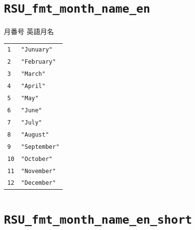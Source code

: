 \section{\texttt{RSU\_fmt\_month\_name\_en}}
\paragraph{\DocStrTitleRDMPredefinedFormatConversion}月番号  英語月名
\begin{center}
\begin{xltabular}{\textwidth}{|p{7truecm}|X|}
\hline
\thead{\DocStrHeaderFormatInput}&\thead{\DocStrHeaderFormatOutput}\\
\hline
\hline
\texttt{1}&\texttt{"Junuary"}\\
\hline
\texttt{2}&\texttt{"February"}\\
\hline
\texttt{3}&\texttt{"March"}\\
\hline
\texttt{4}&\texttt{"April"}\\
\hline
\texttt{5}&\texttt{"May"}\\
\hline
\texttt{6}&\texttt{"June"}\\
\hline
\texttt{7}&\texttt{"July"}\\
\hline
\texttt{8}&\texttt{"August"}\\
\hline
\texttt{9}&\texttt{"September"}\\
\hline
\texttt{10}&\texttt{"October"}\\
\hline
\texttt{11}&\texttt{"November"}\\
\hline
\texttt{12}&\texttt{"December"}\\
\hline
\end{xltabular}
\end{center}
\section{\texttt{RSU\_fmt\_month\_name\_en\_short}}
